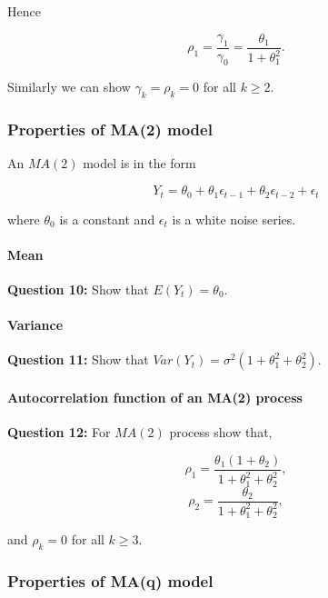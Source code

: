 \documentclass[]{book}
\let\oldparagraph\paragraph
\renewcommand{\paragraph}[1]{\oldparagraph{#1}\mbox{}}
\begin{document}
Hence

\[\rho_1=\frac{\gamma_1}{\gamma_0}=\frac{\theta_1}{1+\theta_1^2}.\]

Similarly we can show \(\gamma_k=\rho_k=0\) for all \(k \geq 2\).

\hypertarget{properties-of-ma2-model}{%
\subsubsection{Properties of MA(2) model}\label{properties-of-ma2-model}}

An \(MA(2)\) model is in the form

\begin{equation}
  \label{eq:ma2}
Y_t = \theta_0 + \theta_1 \epsilon_{t-1} + \theta_2 \epsilon_{t-2} + \epsilon_t
\end{equation}

where \(\theta_0\) is a constant and \({\epsilon_t}\) is a white noise series.

\hypertarget{mean-4}{%
\paragraph{Mean}\label{mean-4}}

\textbf{Question 10:} Show that \(E(Y_t) = \theta_0.\)

\hypertarget{variance-3}{%
\paragraph{Variance}\label{variance-3}}

\textbf{Question 11: } Show that \(Var(Y_t) = \sigma^2 (1+\theta_1^2 + \theta_2^2).\)

\hypertarget{autocorrelation-function-of-an-ma2-process}{%
\paragraph{Autocorrelation function of an MA(2) process}\label{autocorrelation-function-of-an-ma2-process}}

\textbf{Question 12: }For \(MA(2)\) process show that,

\[\rho_1=\frac{\theta_1(1+\theta_2)}{1+\theta_1^2+\theta_2^2},\]
\[\rho_2 = \frac{\theta_2}{1+\theta_1^2 + \theta_2^2},\]

and \(\rho_k=0\) for all \(k \geq 3.\)

\hypertarget{properties-of-maq-model}{%
\subsubsection{Properties of MA(q) model}\label{properties-of-maq-model}}
\end{document}
